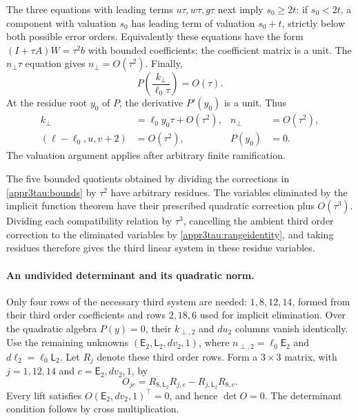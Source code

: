 \documentclass[11pt,a4paper]{article}
\numberwithin{equation}{section}
\theoremstyle{plain}
\theoremstyle{definition}
\theoremstyle{remark}
\begin{document}
The three equations with leading terms $u\tau,w\tau,g\tau$ next imply
$s_0\ge2t$: if $s_0<2t$, a component with valuation $s_0$ has leading
term of valuation $s_0+t$, strictly below both possible error orders.
Equivalently these equations have the form
$(I+\tau A)W=\tau^2b$ with bounded coefficients; the coefficient matrix
is a unit.  The $n_\perp\tau$ equation gives $n_\perp=O(\tau^2)$.  Finally,
\[
 P\left(\frac{k_\perp}{\ell_0\tau}\right)=O(\tau).
\]
At the residue root $y_0$ of $P$, the derivative $P'(y_0)$ is a unit.
Thus
\begin{equation}\label{appr3tau:bounds}
 \begin{aligned}
 k_\perp&=\ell_0y_0\tau+O(\tau^2),& n_\perp&=O(\tau^2),\\
 (\ell-\ell_0,u,v+2)&=O(\tau^2),&P(y_0)&=0.
 \end{aligned}
\end{equation}
The valuation argument applies after arbitrary finite ramification.

The five bounded quotients obtained by dividing the corrections in
\eqref{appr3tau:bounds} by $\tau^2$ have arbitrary residues.  The
variables eliminated by the implicit function theorem have their prescribed quadratic correction plus
$O(\tau^3)$.  Dividing each compatibility relation by $\tau^3$, cancelling
the ambient third order correction to the eliminated variables by
\eqref{appr3tau:rangeidentity}, and taking residues therefore gives
the third linear system in these residue variables.

\paragraph{An undivided determinant and its quadratic norm.}
Only four rows of the necessary third system are needed: $1,8,12,14$,
formed from their third order coefficients and rows $2,18,6$ used for implicit elimination.
Over the quadratic algebra $P(y)=0$, their $k_{\perp,2}$ and $du_2$ columns
vanish identically.  Use the remaining unknowns
$(\mathsf E_2,\mathsf L_2,dv_2,1)$, where
$n_{\perp,2}=\ell_0\mathsf E_2$ and
$d\ell_2=\ell_0\mathsf L_2$.
Let $R_j$ denote these third order rows.  Form a $3\times3$ matrix, with
$j=1,12,14$ and $c=\mathsf E_2,dv_2,1$, by
\begin{equation}\label{appr3tau:determinant}
 O_{jc}=R_{8,\mathsf L_2}R_{j,c}
             -R_{j,\mathsf L_2}R_{8,c}.
\end{equation}
Every lift satisfies $O(\mathsf E_2,dv_2,1)^{\top}=0$, and hence $\det O=0$.
The determinant condition follows by cross multiplication.
\end{document}
